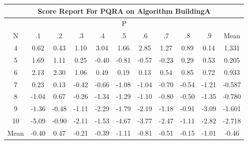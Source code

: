 \documentclass[11pt,a4paper]{report}
\begin{document}
\begin{longtable}{ | c || c | c | c | c | c | c | c | c | c || c |}
\hline
\multicolumn{11}{|c|}{ Score Report For PQRA on Algorithm BuildingA} \\
\hline
\multicolumn{11}{|c|}{ P } \\
\hline
N & .1 & .2 & .3 & .4 & .5 & .6 & .7 & .8 & .9 & Mean\\
 \hline
 \hline
 \endhead
  4 &  \cellcolor[HTML]{EFEFFF} 0.62 &  \cellcolor[HTML]{F7F7FF} 0.43 &  \cellcolor[HTML]{E7E7FF} 1.10 &  \cellcolor[HTML]{AFAFFF} 3.04 &  \cellcolor[HTML]{D7D7FF} 1.66 &  \cellcolor[HTML]{B7B7FF} 2.85 &  \cellcolor[HTML]{DFDFFF} 1.27 &  \cellcolor[HTML]{E7E7FF} 0.89 &  \cellcolor[HTML]{FFFFFF} 0.14 & 1.331 \\
  5 &  \cellcolor[HTML]{D7D7FF} 1.69 &  \cellcolor[HTML]{E7E7FF} 1.11 &  \cellcolor[HTML]{F7F7FF} 0.25 &  \cellcolor[HTML]{FFF7F7} -0.40 &  \cellcolor[HTML]{FFE7E7} -0.81 &  \cellcolor[HTML]{FFEFEF} -0.57 &  \cellcolor[HTML]{FFF7F7} -0.23 &  \cellcolor[HTML]{F7F7FF} 0.29 &  \cellcolor[HTML]{EFEFFF} 0.53 & 0.205 \\
  6 &  \cellcolor[HTML]{C7C7FF} 2.13 &  \cellcolor[HTML]{C7C7FF} 2.30 &  \cellcolor[HTML]{E7E7FF} 1.06 &  \cellcolor[HTML]{EFEFFF} 0.49 &  \cellcolor[HTML]{F7F7FF} 0.19 &  \cellcolor[HTML]{FFFFFF} 0.13 &  \cellcolor[HTML]{EFEFFF} 0.54 &  \cellcolor[HTML]{E7E7FF} 0.85 &  \cellcolor[HTML]{EFEFFF} 0.72 & 0.933 \\
  7 &  \cellcolor[HTML]{F7F7FF} 0.23 &  \cellcolor[HTML]{FFFFFF} 0.13 &  \cellcolor[HTML]{FFF7F7} -0.42 &  \cellcolor[HTML]{FFEFEF} -0.66 &  \cellcolor[HTML]{FFE7E7} -1.08 &  \cellcolor[HTML]{FFE7E7} -1.04 &  \cellcolor[HTML]{FFEFEF} -0.70 &  \cellcolor[HTML]{FFEFEF} -0.54 &  \cellcolor[HTML]{FFDFDF} -1.21 & -0.587 \\
  8 &  \cellcolor[HTML]{FFE7E7} -1.04 &  \cellcolor[HTML]{EFEFFF} 0.67 &  \cellcolor[HTML]{FFF7F7} -0.26 &  \cellcolor[HTML]{FFDFDF} -1.34 &  \cellcolor[HTML]{FFDFDF} -1.29 &  \cellcolor[HTML]{FFE7E7} -1.10 &  \cellcolor[HTML]{FFE7E7} -0.80 &  \cellcolor[HTML]{FFEFEF} -0.50 &  \cellcolor[HTML]{FFDFDF} -1.35 & -0.780 \\
  9 &  \cellcolor[HTML]{FFDFDF} -1.36 &  \cellcolor[HTML]{FFEFEF} -0.48 &  \cellcolor[HTML]{FFE7E7} -1.11 &  \cellcolor[HTML]{FFC7C7} -2.29 &  \cellcolor[HTML]{FFCFCF} -1.79 &  \cellcolor[HTML]{FFC7C7} -2.19 &  \cellcolor[HTML]{FFDFDF} -1.18 &  \cellcolor[HTML]{FFE7E7} -0.91 &  \cellcolor[HTML]{FFAFAF} -3.09 & -1.601 \\
  10 &  \cellcolor[HTML]{FF8080} -5.09 &  \cellcolor[HTML]{FFE7E7} -0.90 &  \cellcolor[HTML]{FFC7C7} -2.11 &  \cellcolor[HTML]{FFD7D7} -1.53 &  \cellcolor[HTML]{FF8787} -4.67 &  \cellcolor[HTML]{FF9F9F} -3.77 &  \cellcolor[HTML]{FFBFBF} -2.47 &  \cellcolor[HTML]{FFE7E7} -1.11 &  \cellcolor[HTML]{FFB7B7} -2.82 & -2.718 \\
 \hline
 \hline
Mean &  \cellcolor[HTML]{FFF7F7} -0.40 &  \cellcolor[HTML]{F7F7FF} 0.47 &  \cellcolor[HTML]{FFF7F7} -0.21 &  \cellcolor[HTML]{FFF7F7} -0.39 &  \cellcolor[HTML]{FFDFDF} -1.11 &  \cellcolor[HTML]{FFE7E7} -0.81 &  \cellcolor[HTML]{FFEFEF} -0.51 &  \cellcolor[HTML]{FFFFFF} -0.15 &  \cellcolor[HTML]{FFE7E7} -1.01 &  \cellcolor[HTML]{FFF7F7} -0.46
\end{longtable}
\end{document}
